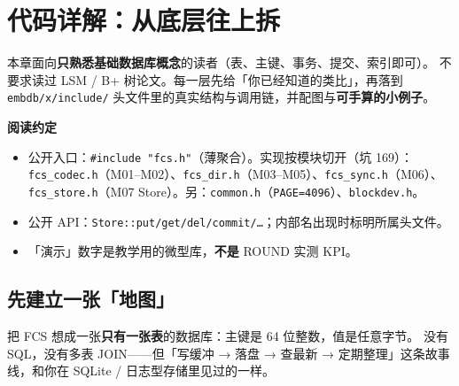 \section{代码详解：从底层往上拆}
\label{sec:code-deep}

本章面向\textbf{只熟悉基础数据库概念}的读者（表、主键、事务、提交、索引即可）。
不要求读过 LSM / B+ 树论文。每一层先给「你已经知道的类比」，再落到 \texttt{embdb/x/include/} 头文件里的真实结构与调用链，并配图与\textbf{可手算的小例子}。

\begin{mdframed}[linecolor=boxline,linewidth=0.5pt,innertopmargin=4pt,innerbottommargin=4pt]
\textbf{阅读约定}
\begin{itemize}[leftmargin=1.4em,itemsep=0.2em]
  \item 公开入口：\texttt{\#include "fcs.h"}（薄聚合）。实现按模块切开（坑 169）：\texttt{fcs\_codec.h}（M01--M02）、\texttt{fcs\_dir.h}（M03--M05）、\texttt{fcs\_sync.h}（M06）、\texttt{fcs\_store.h}（M07 Store）。另：\texttt{common.h}（\texttt{PAGE=4096}）、\texttt{blockdev.h}。
  \item 公开 API：\texttt{Store::put/get/del/commit/\ldots}；内部名出现时标明所属头文件。
  \item 「演示」数字是教学用的微型库，\textbf{不是} ROUND 实测 KPI。
\end{itemize}
\end{mdframed}

\subsection{先建立一张「地图」}
\label{sec:cd-map}

把 FCS 想成一张\textbf{只有一张表}的数据库：主键是 64 位整数，值是任意字节。
没有 SQL，没有多表 JOIN——但「写缓冲 → 落盘 → 查最新 → 定期整理」这条故事线，和你在 SQLite / 日志型存储里见过的一样。

